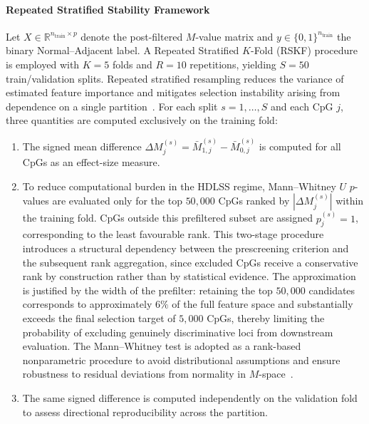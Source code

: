 \paragraph{Repeated Stratified Stability Framework}

Let $X \in \mathbb{R}^{n_{\mathrm{train}} \times p}$ denote 
the post-filtered $M$-value matrix and 
$y \in \{0,1\}^{n_{\mathrm{train}}}$ the binary 
Normal--Adjacent label. A Repeated Stratified $K$-Fold (RSKF) procedure is employed with $K=5$ folds and $R=10$ repetitions, yielding $S = 50$ train/validation splits. 
Repeated stratified resampling reduces the variance of 
estimated feature importance and mitigates selection 
instability arising from dependence on a single 
partition~\cite{Ambroise2002, Smialowski2010}.
For each split $s = 1,\dots,S$ and each CpG $j$, three quantities are computed exclusively on the training fold:
\begin{enumerate}
\item The signed mean difference
\(
\Delta M_{j}^{(s)} = \bar{M}_{1,j}^{(s)} - \bar{M}_{0,j}^{(s)}
\)
is computed for all CpGs as an effect-size measure.

\item To reduce computational burden in the HDLSS regime, 
Mann--Whitney $U$ $p$-values are evaluated only for the top 
$50{,}000$ CpGs ranked by 
$|\Delta M_{j}^{(s)}|$ within the training fold. 
CpGs outside this prefiltered subset are assigned 
$p_{j}^{(s)} = 1$, corresponding to the least favourable rank.
This two-stage procedure introduces a structural dependency 
between the prescreening criterion and the subsequent rank 
aggregation, since excluded CpGs receive a conservative rank 
by construction rather than by statistical evidence. 
The approximation is justified by the width of the prefilter: 
retaining the top $50{,}000$ candidates corresponds to 
approximately $6\%$ of the full feature space and 
substantially exceeds the final selection target of 
$5{,}000$ CpGs, thereby limiting the probability of 
excluding genuinely discriminative loci from downstream 
evaluation.
The Mann--Whitney test is adopted as a rank-based nonparametric procedure to avoid distributional assumptions and ensure robustness to residual deviations from normality in $M$-space~\cite{MannWhitney1947}.

\item The same signed difference is computed independently on the validation fold to assess directional reproducibility across the partition.
\end{enumerate}

